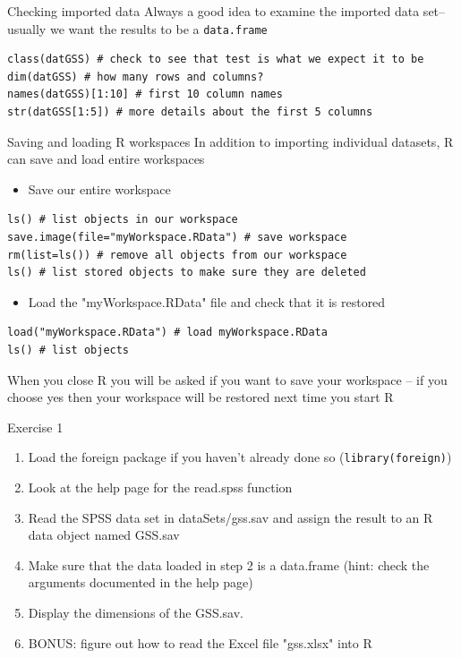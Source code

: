 \documentclass[table,smaller]{beamer}
\begin{document}
\begin{frame}[fragile,label=sec-5-4]{Checking imported data}
 Always a good idea  to examine the imported data set--usually we want the results to be a \verb~data.frame~
\begin{verbatim}
class(datGSS) # check to see that test is what we expect it to be
dim(datGSS) # how many rows and columns?
names(datGSS)[1:10] # first 10 column names
str(datGSS[1:5]) # more details about the first 5 columns
\end{verbatim}
\end{frame}


\begin{frame}[fragile,label=sec-5-5]{Saving and loading R  workspaces}
 In addition to importing individual datasets, R can save and load entire workspaces
\begin{itemize}
\item Save our entire workspace
\end{itemize}
\begin{verbatim}
ls() # list objects in our workspace
save.image(file="myWorkspace.RData") # save workspace 
rm(list=ls()) # remove all objects from our workspace 
ls() # list stored objects to make sure they are deleted
\end{verbatim}

\begin{itemize}
\item Load the "myWorkspace.RData" file and check that it is restored
\end{itemize}

\begin{verbatim}
load("myWorkspace.RData") # load myWorkspace.RData
ls() # list objects
\end{verbatim}

When you close R you will be asked if you want to save your workspace -- if you choose yes then your workspace will be restored next time you start R
\end{frame}


\begin{frame}[fragile,label=sec-5-6]{Exercise 1}
 \begin{enumerate}
\item Load the foreign package if you haven't already done so (\verb~library(foreign)~)

\item Look at the help page for the read.spss function

\item Read the SPSS data set in dataSets/gss.sav and assign the result to an R data object named GSS.sav

\item Make sure that the data loaded in step 2 is a data.frame (hint: check the arguments documented in the help page)

\item Display the dimensions of the GSS.sav.

\item BONUS: figure out how to read the Excel file "gss.xlsx" into R
\end{enumerate}
\end{frame}
\end{document}
